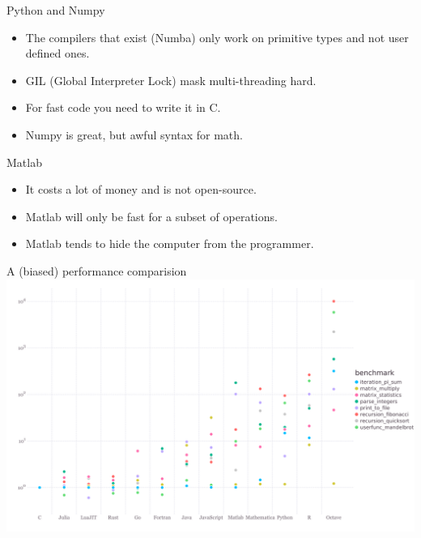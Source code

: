 \documentclass{beamer}
\begin{document}
\begin{frame}{Python and Numpy}
  \begin{itemize}
    \item The compilers that exist (Numba) only work on primitive types and not user defined ones.
    \item GIL (Global Interpreter Lock) mask multi-threading hard.
    \item For fast code you need to write it in C.
    \item Numpy is great, but awful syntax for math.
  \end{itemize}
\end{frame}

\begin{frame}{Matlab}
  \begin{itemize}
    \item It costs a lot of money and is not open-source.
    \item Matlab will only be fast for a subset of operations.
    \item Matlab tends to hide the computer from the programmer.
  \end{itemize}
\end{frame}

\begin{frame}{A (biased) performance comparision}
  \center
  \includegraphics[width=\linewidth]{benchmarks}
\end{frame}
\end{document}
